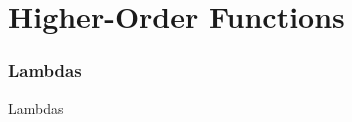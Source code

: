 \part[Higher-Order Functions]{Higher-Order Functions}
\section{Lambdas}
\begin{frame}{Lambdas}

\end{frame}